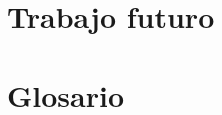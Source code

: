 \documentclass[12pt, oneside]{book}
\begin{document}
\chapter{Trabajo futuro}


\chapter{Glosario}






% 


% 


% 



% 
\end{document}
